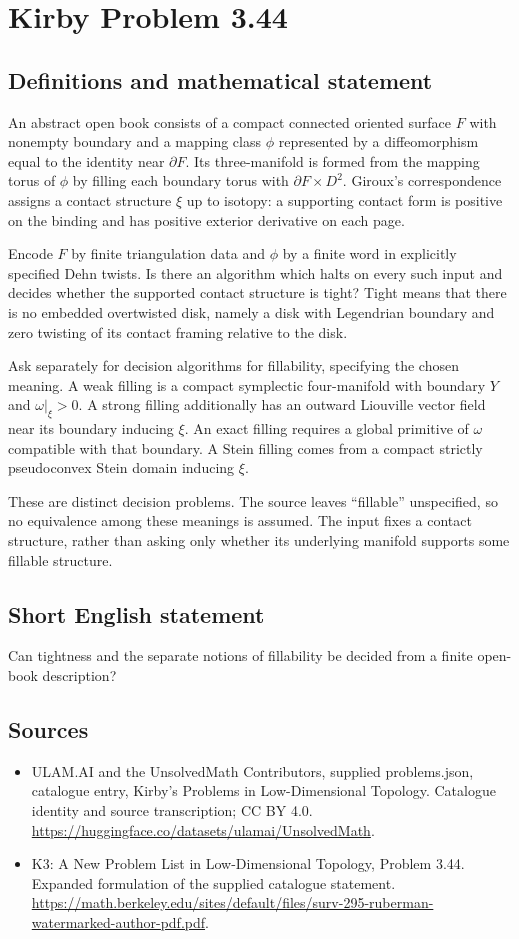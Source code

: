 \documentclass[11pt,a4paper]{article}
\begin{document}
\section*{Kirby Problem 3.44}\label{statement}

\subsection{Definitions and mathematical statement}
An abstract open book consists of a compact connected oriented surface $F$ with nonempty boundary and a mapping class $\phi$ represented by a diffeomorphism equal to the identity near $\partial F$. Its three-manifold is formed from the mapping torus of $\phi$ by filling each boundary torus with $\partial F\times D^2$. Giroux's correspondence assigns a contact structure $\xi$ up to isotopy: a supporting contact form is positive on the binding and has positive exterior derivative on each page.

Encode $F$ by finite triangulation data and $\phi$ by a finite word in explicitly specified Dehn twists. Is there an algorithm which halts on every such input and decides whether the supported contact structure is tight? Tight means that there is no embedded overtwisted disk, namely a disk with Legendrian boundary and zero twisting of its contact framing relative to the disk.

Ask separately for decision algorithms for fillability, specifying the chosen meaning. A weak filling is a compact symplectic four-manifold with boundary $Y$ and $\omega|_\xi>0$. A strong filling additionally has an outward Liouville vector field near its boundary inducing $\xi$. An exact filling requires a global primitive of $\omega$ compatible with that boundary. A Stein filling comes from a compact strictly pseudoconvex Stein domain inducing $\xi$.

These are distinct decision problems. The source leaves ``fillable'' unspecified, so no equivalence among these meanings is assumed. The input fixes a contact structure, rather than asking only whether its underlying manifold supports some fillable structure.
\subsection{Short English statement}
Can tightness and the separate notions of fillability be decided from a finite open-book description?
\subsection{Sources}
\begin{itemize}
\item[S1] ULAM.AI and the UnsolvedMath Contributors, supplied problems.json, catalogue entry, Kirby's Problems in Low-Dimensional Topology. Catalogue identity and source transcription; CC BY 4.0.
\url{https://huggingface.co/datasets/ulamai/UnsolvedMath}.
\item[S2] K3: A New Problem List in Low-Dimensional Topology, Problem 3.44. Expanded formulation of the supplied catalogue statement.
\url{https://math.berkeley.edu/sites/default/files/surv-295-ruberman-watermarked-author-pdf.pdf}.
\end{itemize}
\end{document}
